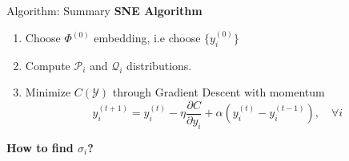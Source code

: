 \documentclass[10pt]{beamer}
\theoremstyle{definition}
\newcommand{\1}{\mathbbm{1}}
\newcommand{\YY}{\mathcal{Y}}
\newcommand{\PP}{\mathcal{P}}
\newcommand{\QQ}{\mathcal{Q}}
\begin{document}
\begin{frame}{Algorithm: Summary}{}
  {\bf SNE Algorithm}
  \begin{enumerate}
    \item Choose $\Phi^{(0)}$ embedding, i.e choose $\{y_i^{(0)}\}$
    \item Compute $\PP_i$ and $\QQ_i$ distributions.
    \item Minimize $C(\YY)$ through Gradient Descent with momentum 
      \[
        y_i^{(t+1)} = y_i^{(t)} - \eta \frac{\partial C}{\partial y_i} +
        \alpha \left( y_i^{(t)} - y_i^{(t-1)} \right),\quad
        \forall i
      \]
  \end{enumerate}
  \vfill
  \begin{center}
    {\bf\large How to find $\sigma_i$?}
  \end{center}
\end{frame}
\end{document}
